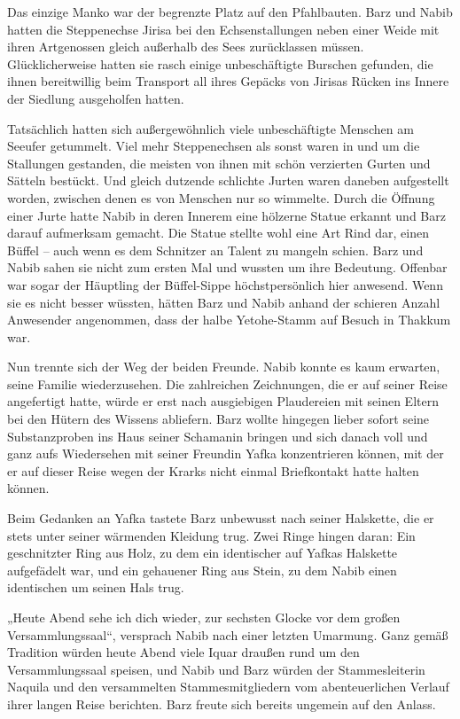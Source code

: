 Das einzige Manko war der begrenzte Platz auf den Pfahlbauten. Barz und Nabib hatten die Steppenechse Jirisa bei den Echsenstallungen neben einer Weide mit ihren Artgenossen gleich außerhalb des Sees zurücklassen müssen. Glücklicherweise hatten sie rasch einige unbeschäftigte Burschen gefunden, die ihnen bereitwillig beim Transport all ihres Gepäcks von Jirisas Rücken ins Innere der Siedlung ausgeholfen hatten.

Tatsächlich hatten sich außergewöhnlich viele unbeschäftigte Menschen am Seeufer getummelt. Viel mehr Steppenechsen als sonst waren in und um die Stallungen gestanden, die meisten von ihnen mit schön verzierten Gurten und Sätteln bestückt. Und gleich dutzende schlichte Jurten waren daneben aufgestellt worden, zwischen denen es von Menschen nur so wimmelte. Durch die Öffnung einer Jurte hatte Nabib in deren Innerem eine hölzerne Statue erkannt und Barz darauf aufmerksam gemacht. Die Statue stellte wohl eine Art Rind dar, einen Büffel – auch wenn es dem Schnitzer an Talent zu mangeln schien. Barz und Nabib sahen sie nicht zum ersten Mal und wussten um ihre Bedeutung. Offenbar war sogar der Häuptling der Büffel-Sippe höchstpersönlich hier anwesend. Wenn sie es nicht besser wüssten, hätten Barz und Nabib anhand der schieren Anzahl Anwesender angenommen, dass der halbe Yetohe-Stamm auf Besuch in Thakkum war.

Nun trennte sich der Weg der beiden Freunde. Nabib konnte es kaum erwarten, seine Familie wiederzusehen. Die zahlreichen Zeichnungen, die er auf seiner Reise angefertigt hatte, würde er erst nach ausgiebigen Plaudereien mit seinen Eltern bei den Hütern des Wissens abliefern. Barz wollte hingegen lieber sofort seine Substanzproben ins Haus seiner Schamanin bringen und sich danach voll und ganz aufs Wiedersehen mit seiner Freundin Yafka konzentrieren können, mit der er auf dieser Reise wegen der Krarks nicht einmal Briefkontakt hatte halten können.

Beim Gedanken an Yafka tastete Barz unbewusst nach seiner Halskette, die er stets unter seiner wärmenden Kleidung trug. Zwei Ringe hingen daran: Ein geschnitzter Ring aus Holz, zu dem ein identischer auf Yafkas Halskette aufgefädelt war, und ein gehauener Ring aus Stein, zu dem Nabib einen identischen um seinen Hals trug.

„Heute Abend sehe ich dich wieder, zur sechsten Glocke vor dem großen Versammlungssaal“, versprach Nabib nach einer letzten Umarmung. Ganz gemäß Tradition würden heute Abend viele Iquar draußen rund um den Versammlungssaal speisen, und Nabib und Barz würden der Stammesleiterin Naquila und den versammelten Stammesmitgliedern vom abenteuerlichen Verlauf ihrer langen Reise berichten. Barz freute sich bereits ungemein auf den Anlass.



